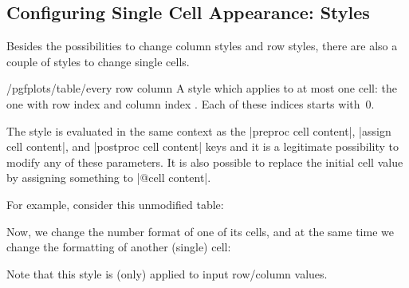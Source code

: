 \subsection{Configuring Single Cell Appearance: Styles}

Besides the possibilities to change column styles and row styles, there are
also a couple of styles to change single cells.

\begin{stylekey}{/pgfplots/table/every row  column }
    A style which applies to at most one cell: the one with row index
     and column index . Each of these indices
    starts with~$0$.

    The style is evaluated in the same context as the |preproc cell content|,
    |assign cell content|, and |postproc cell content| keys and it is a
    legitimate possibility to modify any of these parameters. It is also
    possible to replace the initial cell value by assigning something to
    |@cell content|.

    For example, consider this unmodified table:
\begin{codeexample}[pre={\begin{lateximage}},post={\end{lateximage}}]
\end{codeexample}

    Now, we change the number format of one of its cells, and at the same time
    we change the formatting of another (single) cell:
\begin{codeexample}[pre={\begin{lateximage}},post={\end{lateximage}}]
\end{codeexample}
    Note that this style is (only) applied to input row/column values.
\end{stylekey}

